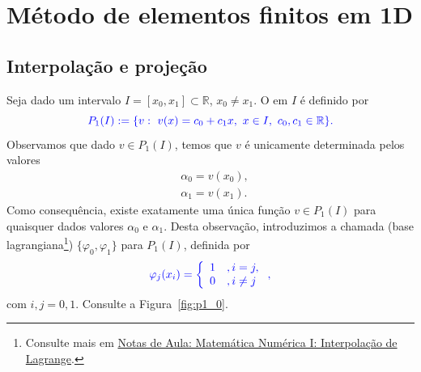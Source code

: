 
\chapter{Método de elementos finitos em 1D}\label{cap_mef1d}
\thispagestyle{fancy}

\section{Interpolação e projeção}\label{cap_mef1d_sec_interproj}

Seja dado um intervalo $I = [x_0, x_1]\subset\mathbb{R}$, $x_0\neq x_1$. O  em $I$ é definido por
\begin{equation}\color{blue}P_1(I) := \{v: ~v(x)=c_0+c_1x,~x\in I,~c_0,c_1\in\mathbb{R}\}.
\end{equation}
Observamos que dado $v\in P_1(I)$, temos que $v$ é unicamente determinada pelos valores
\begin{equation}
  \begin{aligned}
    &\alpha_0 = v(x_0),\\
    &\alpha_1 = v(x_1).
  \end{aligned}
\end{equation}
Como consequência, existe exatamente uma única função $v\in P_1(I)$ para quaisquer dados valores $\alpha_0$ e $\alpha_1$. Desta observação, introduzimos a chamada  (base lagrangiana\footnote{Consulte mais em \href{https://notaspedrok.com.br/notas/MatematicaNumericaI/cap_interp_sec_lagrange.html}{Notas de Aula: Matemática Numérica I: Interpolação de Lagrange}.}) $\{\varphi_0, \varphi_1\}$ para $P_1(I)$, definida por
\begin{equation}\color{blue}\varphi_j(x_i) = \left\{
    \begin{array}{ll}
      1 &, i=j,\\
      0 &, i\neq j
    \end{array}
\right.,
\end{equation}
com $i,j=0, 1$. Consulte a Figura~\ref{fig:p1_0}.

